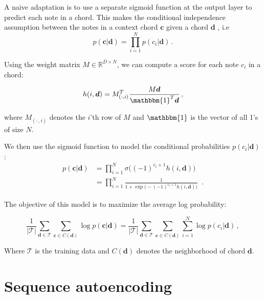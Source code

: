 \documentclass[12pt]{article}\pagestyle{myheadings}
\newcommand{\R}{\mathbb{R}}
\newcommand{\T}{\mathcal{T}}
\newcommand{\boldc}{\boldsymbol c}
\newcommand{\boldd}{\boldsymbol d}
\begin{document}
A naive adaptation is to use a separate sigmoid function at the output layer to predict each note in a chord. This makes the conditional independence assumption between the notes in a context chord $\boldc$ given a chord $\boldd$ , i.e \begin{equation}
p(\boldc | \boldd) = \prod_{i=1}^N  p(c_i |  \boldd) \,.
\end{equation} 

Using the weight matrix $M \in \R^{D \times N}$, we can compute a score for each note $c_i$ in a chord:

\begin{equation}
h(i,\boldd) = M_{(:,i)}^T \frac{M \boldd}{\mathbbm{1}^T \boldd} \,,
\end{equation}

where $M_{(:,i)}$ denotes the $i$'th row of $M$ and $\mathbbm{1}$ is the vector of all 1's of size $N$. 

We then use the sigmoid function to model the conditional probabilities $p(c_i |  \boldd)$:
\begin{equation}
\begin{split}
p(\boldc|\boldd)  &=  \prod_{i=1}^N \sigma\big( (-1)^{c_i+1} h(i,\boldd) \big) \\
& =  \prod_{i=1}^N \frac{1}{1 + \exp \big(- (-1)^{c_i+1} h(i,\boldd) \big)} \,\,\,.
\end{split}
\end{equation}


The objective of this model is to maximize the average log probability:

\begin{equation}
\frac{1}{|\T|} \sum_{\boldd \in \T} \sum_{\boldc \in C(\boldd)} \log p(\boldc|\boldd)
= \frac{1}{|\T|} \sum_{\boldd \in \T} \sum_{\boldc \in C(\boldd)} \sum_{i=1}^N \log p(c_i |  \boldd) \,,
\label{eq:c2v_obj}
\end{equation}

Where $\T$ is the training data and $C(\boldd)$ denotes the neighborhood of chord $\boldd$.

 
 
\section{Sequence autoencoding}
\end{document}
